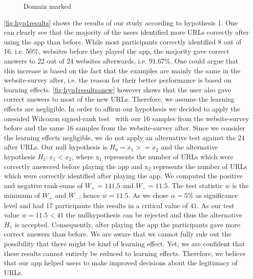 \begin{figure}
\centering
{}
\caption{Domain marked}
\label{fig:hyp3results}
\end{figure}

\begin{description}[leftmargin=0cm]
\item[Hypothesis 1]
\autoref{fig:hyp1results} shows the results of our study according to hypothesis 1. One can clearly see that the majority of the users identified more URLs correctly after using the app than before. While most participants correctly identified 8 out of 16, i.e. 50\%, websites before they played the app, the majority gave correct answers to 22 out of 24 websites afterwards, i.e. 91.67\%. One could argue that this increase is based on the fact that the examples are mainly the same in the website-survey after, i.e. the reason for their better performance is based on learning effects. \autoref{fig:hyp1resultsanew} however shows that the user also gave correct answers to most of the new URLs. Therefore, we assume the learning effects are negligible.
In order to affirm our hypothesis we decided to apply the onesided Wilcoxon signed-rank test~\cite{wilcoxon1945individual} with our 16 samples from the website-survey before and the same 16 samples from the website-survey after.
Since we consider the learning effects negligible, we do not apply an alternative test against the 24 after URLs.
Our null hypothesis is $H_{0} = x_{1} >= x_{2}$ and the alternative hypothesis $H_{1}: x_{1} < x_{2}$, where x$_{1}$ represents the number of URLs which were correctly answered before playing the app and x$_{2}$ represents the number of URLs which were correctly identified after playing the app.
We computed the positive and negative rank-sums of $W_{+} = 141.5$ and $W_{-} = 11.5$.
The test statistic $w$ is the minimum of $W_{+}$ and $W_{-}$, hence $w = 11.5$.
As we chose $\alpha = 5\%$ as significance level and had 17 participants this results in a critical value of $41$.
As our test value $w = 11.5 < 41$ the nullhypothesis can be rejected and thus the alternative $H_{1}$ is accepted.
Consequently, after playing the app the participants gave more correct answers than before.
We are aware that we cannot fully rule out the possibility that there might be kind of learning effect.
Yet, we are confident that these results cannot entirely be reduced to learning effects.
Therefore, we believe that our app helped users to make improved decisions about the legitimacy of URLs.

\end{description}
